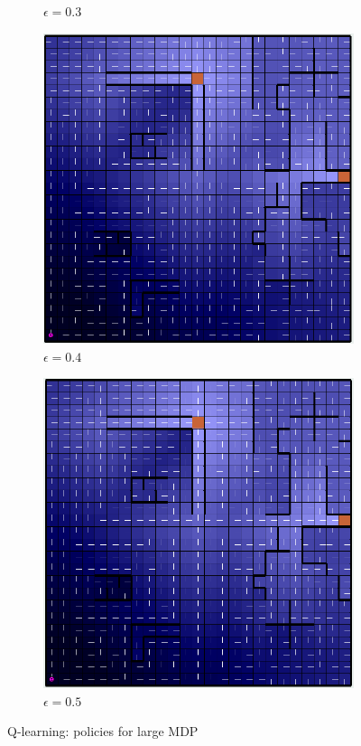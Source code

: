 \documentclass[letterpaper]{article}
\begin{document}
\begin{figure}
\begin{subfigure}{.3\textwidth}
			\caption{$\epsilon = 0.3$}		
		\end{subfigure}
		\begin{subfigure}{.3\textwidth}
			\centering
			\includegraphics[width=\linewidth]{images/big_ql_04}
			\caption{$\epsilon = 0.4$}		
		\end{subfigure}
		\begin{subfigure}{.3\textwidth}
			\centering
			\includegraphics[width=\linewidth]{images/big_ql_05}
			\caption{$\epsilon = 0.5$}		
		\end{subfigure}
		\caption{Q-learning: policies for large MDP}
		\label{fig:mdp-ql-large}%
	\end{figure}%
	
\end{document}
